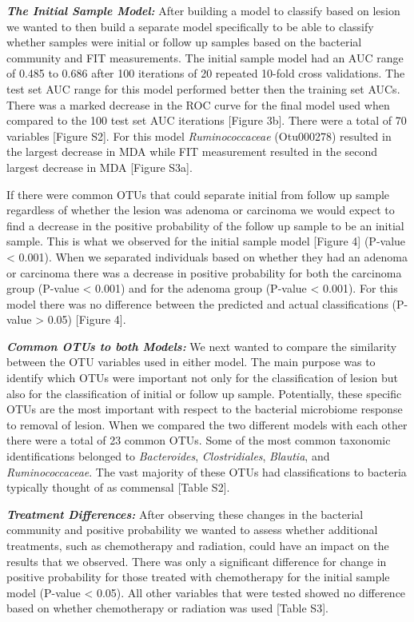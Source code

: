 \documentclass[12pt,]{article}
\begin{document}
\textbf{\emph{The Initial Sample Model:}} After building a model to
classify based on lesion we wanted to then build a separate model
specifically to be able to classify whether samples were initial or
follow up samples based on the bacterial community and FIT measurements.
The initial sample model had an AUC range of 0.485 to 0.686 after 100
iterations of 20 repeated 10-fold cross validations. The test set AUC
range for this model performed better then the training set AUCs. There
was a marked decrease in the ROC curve for the final model used when
compared to the 100 test set AUC iterations {[}Figure 3b{]}. There were
a total of 70 variables {[}Figure S2{]}. For this model
\emph{Ruminococcaceae} (Otu000278) resulted in the largest decrease in
MDA while FIT measurement resulted in the second largest decrease in MDA
{[}Figure S3a{]}.

If there were common OTUs that could separate initial from follow up
sample regardless of whether the lesion was adenoma or carcinoma we
would expect to find a decrease in the positive probability of the
follow up sample to be an initial sample. This is what we observed for
the initial sample model {[}Figure 4{]} (P-value \textless{} 0.001).
When we separated individuals based on whether they had an adenoma or
carcinoma there was a decrease in positive probability for both the
carcinoma group (P-value \textless{} 0.001) and for the adenoma group
(P-value \textless{} 0.001). For this model there was no difference
between the predicted and actual classifications (P-value \textgreater{}
0.05) {[}Figure 4{]}.

\textbf{\emph{Common OTUs to both Models:}} We next wanted to compare
the similarity between the OTU variables used in either model. The main
purpose was to identify which OTUs were important not only for the
classification of lesion but also for the classification of initial or
follow up sample. Potentially, these specific OTUs are the most
important with respect to the bacterial microbiome response to removal
of lesion. When we compared the two different models with each other
there were a total of 23 common OTUs. Some of the most common taxonomic
identifications belonged to \emph{Bacteroides}, \emph{Clostridiales},
\emph{Blautia}, and \emph{Ruminococcaceae}. The vast majority of these
OTUs had classifications to bacteria typically thought of as commensal
{[}Table S2{]}.

\textbf{\emph{Treatment Differences:}} After observing these changes in
the bacterial community and positive probability we wanted to assess
whether additional treatments, such as chemotherapy and radiation, could
have an impact on the results that we observed. There was only a
significant difference for change in positive probability for those
treated with chemotherapy for the initial sample model (P-value
\textless{} 0.05). All other variables that were tested showed no
difference based on whether chemotherapy or radiation was used {[}Table
S3{]}.
\end{document}
